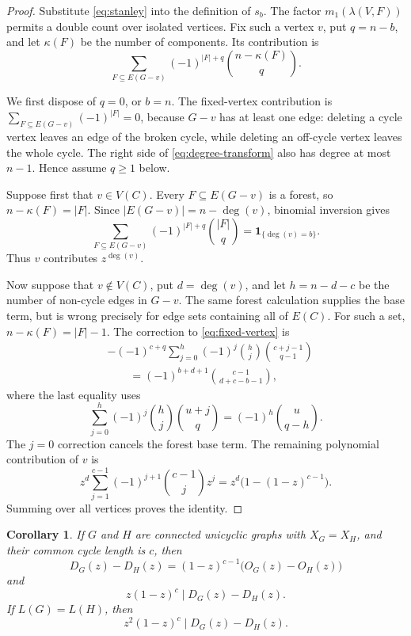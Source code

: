 \documentclass[11pt]{amsart}
\newtheorem{corollary}[theorem]{Corollary}
\theoremstyle{definition}
\newcommand{\CSF}{X}
\newcommand{\cycle}{C}
\begin{document}
\begin{proof}
Substitute \eqref{eq:stanley} into the definition of \(s_b\).
The factor \(m_1(\lambda(V,F))\) permits a double count over isolated
vertices.  Fix such a vertex \(v\), put \(q=n-b\), and let
\(\kappa(F)\) be the number of components.  Its contribution is
\begin{equation}\label{eq:fixed-vertex}
\sum_{F\subseteq E(G-v)}(-1)^{|F|+q}
\binom{n-\kappa(F)}q.
\end{equation}

We first dispose of \(q=0\), or \(b=n\).  The fixed-vertex contribution is
\(\sum_{F\subseteq E(G-v)}(-1)^{|F|}=0\), because \(G-v\) has at least one
edge: deleting a cycle vertex leaves an edge of the broken cycle, while
deleting an off-cycle vertex leaves the whole cycle.  The right side of
\eqref{eq:degree-transform} also has degree at most \(n-1\).  Hence assume
\(q\geq1\) below.

Suppose first that \(v\in V(\cycle)\).  Every \(F\subseteq E(G-v)\) is a
forest, so \(n-\kappa(F)=|F|\).  Since
\(|E(G-v)|=n-\deg(v)\), binomial inversion gives
\[
\sum_{F\subseteq E(G-v)}(-1)^{|F|+q}\binom{|F|}q
=\boldsymbol 1_{\{\deg(v)=b\}}.
\]
Thus \(v\) contributes \(z^{\deg(v)}\).

Now suppose that \(v\notin V(\cycle)\), put \(d=\deg(v)\), and let
\(h=n-d-c\) be the number of non-cycle edges in \(G-v\).  The same forest
calculation supplies the base term, but is wrong precisely for edge sets
containing all of \(E(\cycle)\).  For such a set,
\(n-\kappa(F)=|F|-1\).  The correction to
\eqref{eq:fixed-vertex} is
\begin{align*}
&-(-1)^{c+q}\sum_{j=0}^{h}(-1)^j\binom hj
  \binom{c+j-1}{q-1}\\
&\qquad=(-1)^{b+d+1}\binom{c-1}{d+c-b-1},
\end{align*}
where the last equality uses
\[
\sum_{j=0}^{h}(-1)^j\binom hj\binom{u+j}{q}
=(-1)^h\binom u{q-h}.
\]
The \(j=0\) correction cancels the forest base term.  The remaining
polynomial contribution of \(v\) is
\[
z^d\sum_{j=1}^{c-1}(-1)^{j+1}\binom{c-1}{j}z^j
=z^d\bigl(1-(1-z)^{c-1}\bigr).
\]
Summing over all vertices proves the identity.
\end{proof}

\begin{corollary}\label{cor:degree-divisibility}
If \(G\) and \(H\) are connected unicyclic graphs with
\(\CSF_G=\CSF_H\), and their common cycle length is \(c\), then
\begin{equation}\label{eq:degree-divisibility}
D_G(z)-D_H(z)=(1-z)^{c-1}\bigl(O_G(z)-O_H(z)\bigr)
\end{equation}
and
\begin{equation}\label{eq:basic-divisibility}
z(1-z)^c\mid D_G(z)-D_H(z).
\end{equation}
If \(L(G)=L(H)\), then
\begin{equation}\label{eq:leaf-divisibility}
z^2(1-z)^c\mid D_G(z)-D_H(z).
\end{equation}
\end{corollary}
\end{document}
